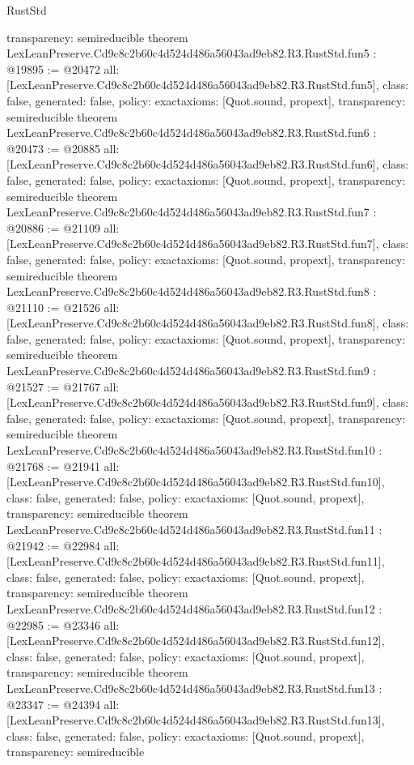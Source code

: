 \begin{lexlean}{RustStd}
\begin{coremodule}
{  transparency: semireducible
}
theorem LexLeanPreserve.Cd9c8c2b60c4d524d486a56043ad9eb82.R3.RustStd.fun5 : @19895 := @20472 {
  all: [LexLeanPreserve.Cd9c8c2b60c4d524d486a56043ad9eb82.R3.RustStd.fun5],
  class: false,
  generated: false,
  policy: exact{axioms: [Quot.sound, propext]},
  transparency: semireducible
}
theorem LexLeanPreserve.Cd9c8c2b60c4d524d486a56043ad9eb82.R3.RustStd.fun6 : @20473 := @20885 {
  all: [LexLeanPreserve.Cd9c8c2b60c4d524d486a56043ad9eb82.R3.RustStd.fun6],
  class: false,
  generated: false,
  policy: exact{axioms: [Quot.sound, propext]},
  transparency: semireducible
}
theorem LexLeanPreserve.Cd9c8c2b60c4d524d486a56043ad9eb82.R3.RustStd.fun7 : @20886 := @21109 {
  all: [LexLeanPreserve.Cd9c8c2b60c4d524d486a56043ad9eb82.R3.RustStd.fun7],
  class: false,
  generated: false,
  policy: exact{axioms: [Quot.sound, propext]},
  transparency: semireducible
}
theorem LexLeanPreserve.Cd9c8c2b60c4d524d486a56043ad9eb82.R3.RustStd.fun8 : @21110 := @21526 {
  all: [LexLeanPreserve.Cd9c8c2b60c4d524d486a56043ad9eb82.R3.RustStd.fun8],
  class: false,
  generated: false,
  policy: exact{axioms: [Quot.sound, propext]},
  transparency: semireducible
}
theorem LexLeanPreserve.Cd9c8c2b60c4d524d486a56043ad9eb82.R3.RustStd.fun9 : @21527 := @21767 {
  all: [LexLeanPreserve.Cd9c8c2b60c4d524d486a56043ad9eb82.R3.RustStd.fun9],
  class: false,
  generated: false,
  policy: exact{axioms: [Quot.sound, propext]},
  transparency: semireducible
}
theorem LexLeanPreserve.Cd9c8c2b60c4d524d486a56043ad9eb82.R3.RustStd.fun10 : @21768 := @21941 {
  all: [LexLeanPreserve.Cd9c8c2b60c4d524d486a56043ad9eb82.R3.RustStd.fun10],
  class: false,
  generated: false,
  policy: exact{axioms: [Quot.sound, propext]},
  transparency: semireducible
}
theorem LexLeanPreserve.Cd9c8c2b60c4d524d486a56043ad9eb82.R3.RustStd.fun11 : @21942 := @22984 {
  all: [LexLeanPreserve.Cd9c8c2b60c4d524d486a56043ad9eb82.R3.RustStd.fun11],
  class: false,
  generated: false,
  policy: exact{axioms: [Quot.sound, propext]},
  transparency: semireducible
}
theorem LexLeanPreserve.Cd9c8c2b60c4d524d486a56043ad9eb82.R3.RustStd.fun12 : @22985 := @23346 {
  all: [LexLeanPreserve.Cd9c8c2b60c4d524d486a56043ad9eb82.R3.RustStd.fun12],
  class: false,
  generated: false,
  policy: exact{axioms: [Quot.sound, propext]},
  transparency: semireducible
}
theorem LexLeanPreserve.Cd9c8c2b60c4d524d486a56043ad9eb82.R3.RustStd.fun13 : @23347 := @24394 {
  all: [LexLeanPreserve.Cd9c8c2b60c4d524d486a56043ad9eb82.R3.RustStd.fun13],
  class: false,
  generated: false,
  policy: exact{axioms: [Quot.sound, propext]},
  transparency: semireducible
}
\end{coremodule}
\end{lexlean}
